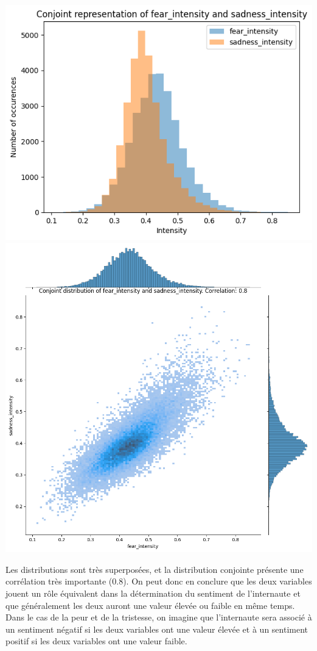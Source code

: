 \documentclass{article}
\begin{document}
\begin{center}
    \includegraphics[scale=0.39]{./img/conjoint_representation_fear_intensity_sadness_intensity.png}
    \includegraphics[scale=0.23]{./img/conjoint_distribution_fear_intensity_sadness_intensity.png}
\end{center}

Les distributions sont très superposées, et la distribution conjointe présente une
corrélation très importante (0.8). On peut donc en conclure que les deux variables jouent
un rôle équivalent dans la détermination du sentiment de l'internaute et que
généralement les deux auront une valeur élevée ou faible en même temps. Dans le cas de
la peur et de la tristesse, on imagine que l'internaute sera associé à un sentiment négatif
si les deux variables ont une valeur élevée et à un sentiment positif si les deux variables
ont une valeur faible.
\end{document}
